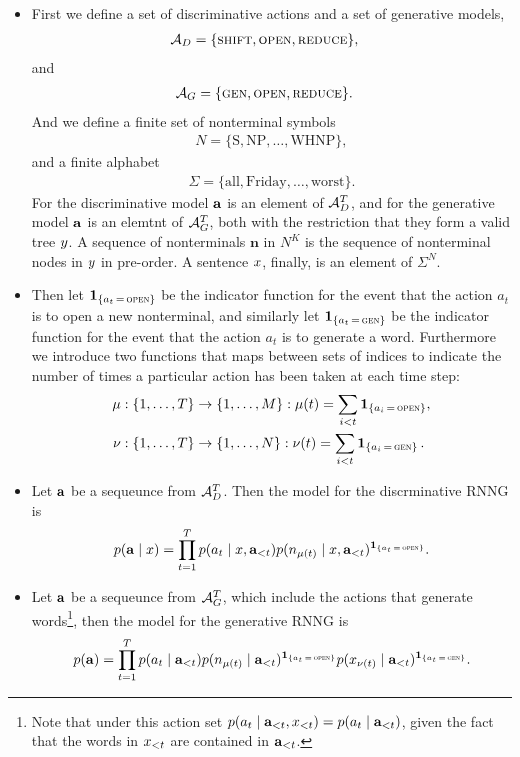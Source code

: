 \begin{itemize}
  \item First we define a set of discriminative actions and a set of generative models,
  \begin{align}
    \mathcal{A}_D &= \{ \textsc{shift}, \textsc{open}, \textsc{reduce} \},
  \end{align}
  and
  \begin{align}
    \mathcal{A}_G &= \{ \textsc{gen}, \textsc{open}, \textsc{reduce} \}.
  \end{align}
  And we define a finite set of nonterminal symbols
  \begin{align*}
    N = \{ \text{S}, \text{NP}, \dots, \text{WHNP}\},
  \end{align*}
  and a finite alphabet
  \begin{align*}
    \Sigma = \{ \text{all}, \text{Friday}, \dots, \text{worst} \}.
  \end{align*}
  For the discriminative model $\mathbf{a}$ is an element of $\mathcal{A}_D^T$, and for the generative model $\mathbf{a}$ is an elemtnt of $\mathcal{A}_G^T$, both with the restriction that they form a valid tree $y$. A sequence of nonterminals $\mathbf{n}$ in $N^K$ is the sequence of nonterminal nodes in $y$ in pre-order. A sentence $x$, finally, is an element of $\Sigma^N$.

  \item Then let $\operatorname{\mathbf{1}}_{ \{ a_t \, = \, \textsc{open} \} }$ be the indicator function for the event that the action $a_t$ is to open a new nonterminal, and similarly let $\operatorname{\mathbf{1}}_{ \{ a_t \, = \, \textsc{gen} \} }$ be the indicator function for the event that the action $a_t$ is to generate a word. Furthermore we introduce two functions that maps between sets of indices to indicate the number of times a particular action has been taken at each time step:
  \begin{align*}
    \mu &: \{ 1, \dots, T \} \to \{ 1, \dots, M \}: \mu(t) = \sum_{i < t} \operatorname{\mathbf{1}}_{ \{ a_i \, = \, \textsc{open} \} },  \\
    \nu &: \{ 1, \dots, T \} \to \{ 1, \dots, N \}: \nu(t) = \sum_{i < t} \operatorname{\mathbf{1}}_{ \{ a_i \, = \, \textsc{gen} \} }.
  \end{align*}

  \item Let $\mathbf{a}$ be a sequeunce from $\mathcal{A}_D^T$. Then the model for the discrminative RNNG is
  \begin{align}
    \label{eq:disc-model}
    p(\mathbf{a} \mid x) = \prod_{t=1}^T p(a_t \mid x, \mathbf{a}_{<t}) p(n_{\mu(t)} \mid x, \mathbf{a}_{<t} )^{ \operatorname{\mathbf{1}}_{ \{ a_t \, = \, \textsc{open} \} } }.
  \end{align}
  \item Let $\mathbf{a}$ be a sequeunce from $\mathcal{A}_G^T$, which include the actions that generate words\footnote{Note that under this action set $p(a_t \mid \mathbf{a}_{<t}, x_{<t}) = p(a_t \mid \mathbf{a}_{<t})$, given the fact that the words in $x_{<t}$ are contained in $\mathbf{a}_{<t}$.}, then the model for the generative RNNG is
  \begin{align}
    \label{eq:gen-model}
    p(\mathbf{a}) = \prod_{t=1}^T p(a_t \mid \mathbf{a}_{<t}) p(n_{\mu(t)} \mid   \mathbf{a}_{<t})^{ \operatorname{\mathbf{1}}_{ \{ a_t \, = \, \textsc{open} \} } } p(x_{\nu(t)} \mid \mathbf{a}_{<t})^{ \operatorname{\mathbf{1}}_{ \{ a_t \, = \, \textsc{gen} \} } }.
  \end{align}


\end{itemize}
